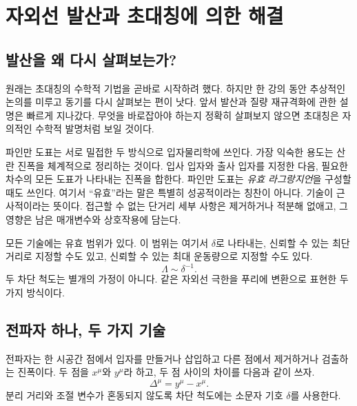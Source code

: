 \chapter{자외선 발산과 초대칭에 의한 해결}


\section{발산을 왜 다시 살펴보는가?}

원래는 초대칭의 수학적 기법을 곧바로 시작하려 했다. 하지만 한 강의 동안 추상적인 논의를 미루고 동기를 다시 살펴보는 편이 낫다. 앞서 발산과 질량 재규격화에 관한 설명은 빠르게 지나갔다. 무엇을 바로잡아야 하는지 정확히 살펴보지 않으면 초대칭은 자의적인 수학적 발명처럼 보일 것이다.

파인만 도표는 서로 밀접한 두 방식으로 입자물리학에 쓰인다. 가장 익숙한 용도는 산란 진폭을 체계적으로 정리하는 것이다. 입사 입자와 출사 입자를 지정한 다음, 필요한 차수의 모든 도표가 나타내는 진폭을 합한다. 파인만 도표는 \emph{유효 라그랑지언}을 구성할 때도 쓰인다. 여기서 ``유효''라는 말은 특별히 성공적이라는 칭찬이 아니다. 기술이 근사적이라는 뜻이다. 접근할 수 없는 단거리 세부 사항은 제거하거나 적분해 없애고, 그 영향은 남은 매개변수와 상호작용에 담는다.

모든 기술에는 유효 범위가 있다. 이 범위는 여기서 \(\delta\)로 나타내는, 신뢰할 수 있는 최단 거리로 지정할 수도 있고, 신뢰할 수 있는 최대 운동량으로 지정할 수도 있다.
\begin{equation}
\Lambda\sim \delta^{-1}.
\end{equation}
두 차단 척도는 별개의 가정이 아니다. 같은 자외선 극한을 푸리에 변환으로 표현한 두 가지 방식이다.

\section{전파자 하나, 두 가지 기술}

전파자는 한 시공간 점에서 입자를 만들거나 삽입하고 다른 점에서 제거하거나 검출하는 진폭이다. 두 점을 \(x^\mu\)와 \(y^\mu\)라 하고, 두 점 사이의 차이를 다음과 같이 쓰자.
\begin{equation}
\Delta^\mu=y^\mu-x^\mu.
\end{equation}
분리 거리와 조절 변수가 혼동되지 않도록 차단 척도에는 소문자 기호 \(\delta\)를 사용한다.

